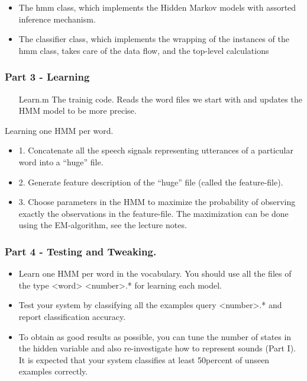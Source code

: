 \documentclass[titlepage]{article}
\begin{document}
\begin{itemize}
\item The hmm class, which implements the Hidden Markov models with assorted inference mechanism.
\item The classifier class, which implements the wrapping of the instances of the hmm class, takes care of the data ﬂow, and the top-level calculations
\end{itemize}	

    \subsubsection{Part 3 - Learning}
\begin{itemize}
\item[Learn.m] The trainig code. Reads the word files we start with and updates the HMM model to be more precise.  
\end{itemize}

Learning one HMM per word. 
\begin{itemize}
\item 1. Concatenate all the speech signals representing utterances of a particular word into a “huge” ﬁle.
\item 2. Generate feature description of the “huge” ﬁle (called the feature-ﬁle).
\item 3. Choose parameters in the HMM to maximize the probability of observing exactly the observations in the feature-ﬁle. The maximization can be done using the EM-algorithm, see the lecture notes.
\end{itemize}

    \subsubsection{Part 4 - Testing and Tweaking. }

\begin{itemize}
\item Learn one HMM per word in the vocabulary. You should use all the ﬁles of the type <word> <number>.* for learning each model.
\item Test your system by classifying all the examples query <number>.* and report classiﬁcation accuracy.
\item To obtain as good results as possible, you can tune the number of states in the hidden variable and also re-investigate how to represent sounds (Part I). It is expected that your system classiﬁes at least 50percent of unseen examples correctly.
\end{itemize}
\end{document}
